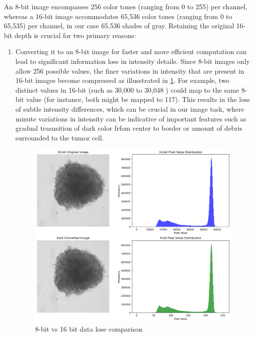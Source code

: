 An 8-bit image encompasses 256 color tones (ranging from 0 to 255) per channel, whereas a 16-bit image accommodates 65,536 color tones 
(ranging from 0 to 65,535) per channel, in our case 65,536 shades of gray. Retaining the original 16-bit depth is crucial for two primary reasons:
\begin{enumerate}
  \item Converting it to an 8-bit image for faster and more efficient computation can lead to significant information loss in intensity details.
Since 8-bit images only allow 256 possible values, the finer variations in intensity that are present in 16-bit images become compressed as illusstrated in \ref{fig:8bitvs16bit}.
For example, two distinct values in 16-bit (such as 30,000 to 30,048 ) could map to the same 8-bit value (for instance, both might be mapped to 117).
This results in the loss of subtle intensity differences, which can be crucial in our image task, where minute variations in intensity can be indicative
 of important features such as gradual trasnsition of dark color frfom center to border or amount of debris surrounded to the tumor cell.


 \begin{figure}[H]
  \centering
  \includegraphics[scale=0.5]{figures/8bitvs16bit.png} 
  \caption{8-bit vs 16 bit data lose comparison}
  \label{fig:8bitvs16bit}
\end{figure}


\end{enumerate}
